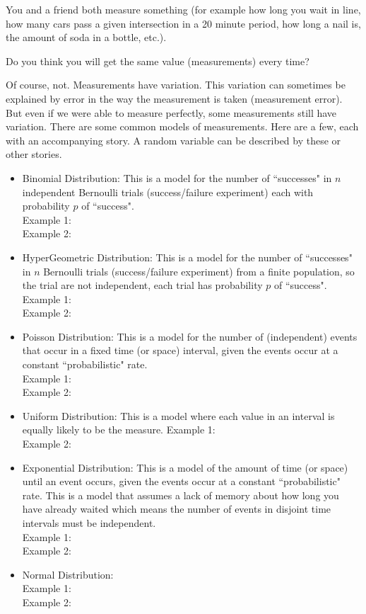 \documentclass{article}
\begin{document}
\noindent You and a friend both measure something (for example how long you wait in line, how many cars pass a given intersection in a 20 minute period, how long a nail is, the amount of soda in a bottle, etc.). 

Do you think you will get the same value (measurements) every time?

Of course, not. Measurements have variation. This variation can sometimes be explained by error in the way the measurement is taken (measurement error). But even if we were able to measure perfectly, some measurements still have variation. There are some common models of measurements. Here are a few, each with an accompanying story. A random variable can be described by these or other stories.
\begin{itemize}
\item Binomial Distribution: This is a model for the number of ``successes" in $n$ independent Bernoulli trials (success/failure experiment) each with probability $p$ of ``success".\\
Example 1:\\
Example 2:\\

\item HyperGeometric Distribution: This is a model for the number of ``successes" in $n$ Bernoulli trials (success/failure experiment) from a finite population, so the trial are not independent, each trial has probability $p$ of ``success". \\
Example 1:\\
Example 2:\\

\item Poisson Distribution: This is a model for the number of (independent) events that occur in a fixed time (or space) interval, given the events occur at a constant ``probabilistic" rate.\\
Example 1:\\
Example 2:\\
\item Uniform Distribution: This is a model where each value in an interval is equally likely to be the measure. 
Example 1:\\
Example 2:\\

\item Exponential Distribution: This is a model of the amount of time (or space) until an event occurs, given the events occur at a constant ``probabilistic" rate. This is a model that assumes a lack of memory about how long you have already waited which means the number of events in disjoint time intervals must be independent.\\
Example 1:\\
Example 2:\\

\item Normal Distribution: \\
Example 1:\\
Example 2:\\
\end{itemize}
\end{document}
